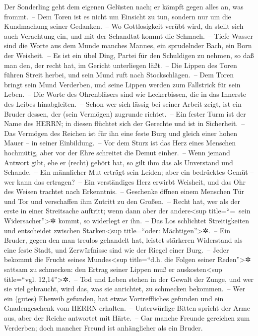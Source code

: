 Der Sonderling geht dem eigenen Gelüsten nach; er kämpft
gegen alles an, was frommt.~-- Dem Toren ist es nicht um
Einsicht zu tun, sondern nur um die Kundmachung seiner Gedanken.~--
Wo Gottlosigkeit verübt wird, da stellt sich auch
Verachtung ein, und mit der Schandtat kommt die Schmach.~--
Tiefe Wasser sind die Worte aus dem Munde manches Mannes,
ein sprudelnder Bach, ein Born der Weisheit.~-- Es ist ein
übel Ding, Partei für den Schuldigen zu nehmen, so daß man den, der
recht hat, im Gericht unterliegen läßt.~-- Die Lippen des
Toren führen Streit herbei, und sein Mund ruft nach Stockschlägen.~--
Dem Toren bringt sein Mund Verderben, und seine Lippen
werden zum Fallstrick für sein Leben.~-- Die Worte des
Ohrenbläsers sind wie Leckerbissen, die in das Innerste des Leibes
hinabgleiten.~-- Schon wer sich lässig bei seiner Arbeit
zeigt, ist ein Bruder dessen, der (sein Vermögen) zugrunde richtet.~--
Ein fester Turm ist der Name des HERRN; in diesen
flüchtet sich der Gerechte und ist in Sicherheit.~-- Das
Vermögen des Reichen ist für ihn eine feste Burg und gleich einer hohen
Mauer -- in seiner Einbildung.~-- Vor dem Sturz ist das
Herz eines Menschen hochmütig, aber vor der Ehre schreitet die Demut
einher.~-- Wenn jemand Antwort gibt, ehe er (recht)
gehört hat, so gilt ihm das als Unverstand und Schande.~--
Ein männlicher Mut erträgt sein Leiden; aber ein
bedrücktes Gemüt -- wer kann das ertragen?~-- Ein
verständiges Herz erwirbt Weisheit, und das Ohr des Weisen trachtet nach
Erkenntnis.~-- Geschenke öffnen einem Menschen Tür und
Tor und verschaffen ihm Zutritt zu den Großen.~-- Recht
hat, wer als der erste in einer Streitsache auftritt; wenn dann aber der
andere\textless sup title=``=~sein Widersacher''\textgreater✲ kommt, so
widerlegt er ihn.~-- Das Los schlichtet Streitigkeiten
und entscheidet zwischen Starken\textless sup title=``oder:
Mächtigen''\textgreater✲.~-- Ein Bruder, gegen den man
treulos gehandelt hat, leistet stärkeren Widerstand als eine feste
Stadt, und Zerwürfnisse sind wie der Riegel einer Burg.~--
Jeder bekommt die Frucht seines Mundes\textless sup
title=``d.h. die Folgen seiner Reden''\textgreater✲ sattsam zu
schmecken: den Ertrag seiner Lippen muß er auskosten\textless sup
title=``vgl. 12,14''\textgreater✲.~-- Tod und Leben
stehen in der Gewalt der Zunge, und wer sie viel gebraucht, wird das,
was sie anrichtet, zu schmecken bekommen.~-- Wer ein
(gutes) Eheweib gefunden, hat etwas Vortreffliches gefunden und ein
Gnadengeschenk vom HERRN erhalten.~-- Unterwürfige Bitten
spricht der Arme aus, aber der Reiche antwortet mit Härte.~--
Gar manche Freunde gereichen zum Verderben; doch mancher
Freund ist anhänglicher als ein Bruder.

